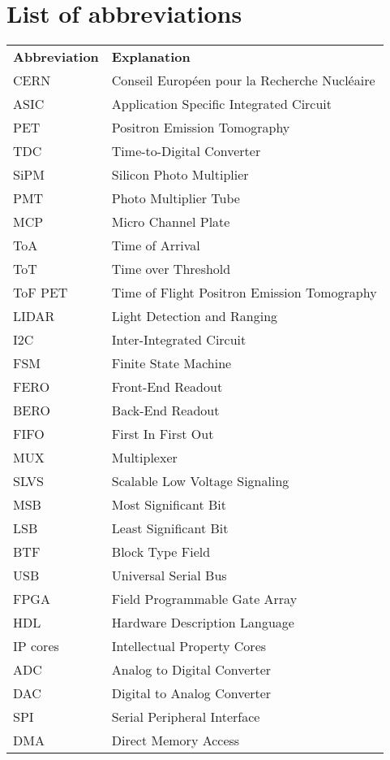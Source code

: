 \documentclass[twoside]{ctuthesis}
\theoremstyle{plain}
\theoremstyle{definition}
\theoremstyle{note}
\begin{document}
\chapter*{List of abbreviations}
\noindent
\begin{tabularx}{\linewidth}
{ l >{\raggedright\arraybackslash}X }
\bfseries Abbreviation & \bfseries Explanation\\\Midrule
CERN & Conseil Européen pour la Recherche Nucléaire \\
ASIC & Application Specific Integrated Circuit \\
PET & Positron Emission Tomography\\
TDC & Time-to-Digital Converter\\
SiPM & Silicon Photo Multiplier\\
PMT & Photo Multiplier Tube\\
MCP & Micro Channel Plate\\
ToA & Time of Arrival\\
ToT & Time over Threshold\\
ToF PET & Time of Flight Positron Emission Tomography\\
LIDAR & Light Detection and Ranging\\
I2C & Inter-Integrated Circuit\\
FSM & Finite State Machine\\
FERO & Front-End Readout\\
BERO & Back-End Readout\\
FIFO & First In First Out\\
MUX & Multiplexer\\
SLVS & Scalable Low Voltage Signaling\\
MSB & Most Significant Bit\\
LSB & Least Significant Bit\\
BTF & Block Type Field\\
USB & Universal Serial Bus\\
FPGA & Field Programmable Gate Array\\
HDL & Hardware Description Language\\
IP cores & Intellectual Property Cores\\
ADC & Analog to Digital Converter\\
DAC & Digital to Analog Converter\\
SPI & Serial Peripheral Interface\\
DMA & Direct Memory Access\\
\end{tabularx}
\end{document}
